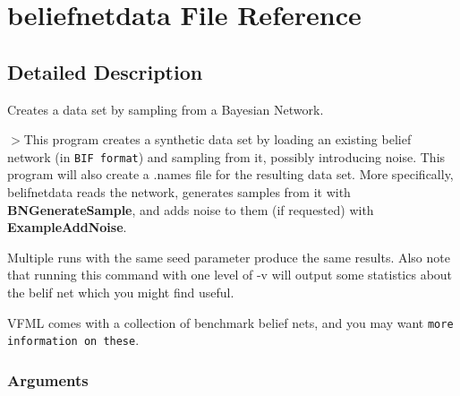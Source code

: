 \section{beliefnetdata File Reference}
\label{beliefnetdata}


\subsection{Detailed Description}
Creates a data set by sampling from a Bayesian Network. 

$>$This program creates a synthetic data set by loading an existing belief network (in {\tt BIF format}) and sampling from it, possibly introducing noise. This program will also create a .names file for the resulting data set. More specifically, belifnetdata reads the network, generates samples from it with {\bf BNGenerate\-Sample}, and adds noise to them (if requested) with {\bf Example\-Add\-Noise}.

Multiple runs with the same seed parameter produce the same results. Also note that running this command with one level of -v will output some statistics about the belif net which you might find useful.

VFML comes with a collection of benchmark belief nets, and you may want {\tt more information on these}.

\subsubsection*{Arguments}

